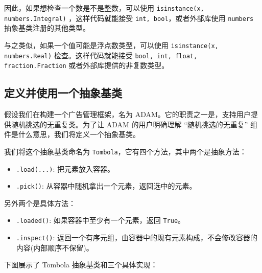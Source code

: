 因此，如果想检查一个数是不是整数，可以使用 \texttt{isinstance(x, numbers.Integral)} ，这样代码就能接受 \texttt{int, bool}，或者外部库使用 \texttt{numbers} 抽象基类注册的其他类型。

与之类似，如果一个值可能是浮点数类型，可以使用 \texttt{isinstance(x, numbers.Real)} 检查。这样代码就能接受 \texttt{bool, int, float, fraction.Fraction} 或者外部库提供的非复数类型。

\subsection{定义并使用一个抽象基类}

假设我们在构建一个广告管理框架，名为 ADAM。它的职责之一是，支持用户提供随机挑选的无重复类。为了让 ADAM 的用户明确理解 ``随机挑选的无重复'' 组件是什么意思，我们将定义一个抽象基类。

我们将这个抽象基类命名为 \texttt{Tombola}，它有四个方法，其中两个是抽象方法：
\begin{itemize}
    \item \texttt{.load(...)}: 把元素放入容器。
    \item \texttt{.pick()}: 从容器中随机拿出一个元素，返回选中的元素。
\end{itemize}
另外两个是具体方法：
\begin{itemize}
    \item \texttt{.loaded()}: 如果容器中至少有一个元素，返回 \texttt{True}。
    \item \texttt{.inspect()}: 返回一个有序元组，由容器中的现有元素构成，不会修改容器的内容(内部顺序不保留)。
\end{itemize}

下图展示了 Tombola 抽象基类和三个具体实现：

